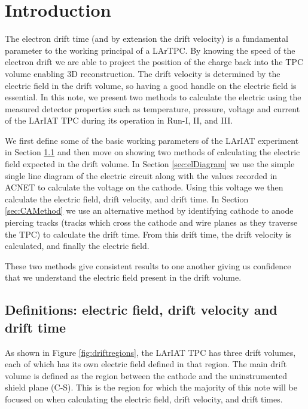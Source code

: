 \section{Introduction}\label{sec:Introduction} \label{sec:Intro}
The electron drift time (and by extension the drift velocity) is a fundamental parameter to the working principal of a LArTPC. By knowing the speed of the electron drift we are able to project the position of the charge back into the TPC volume enabling 3D reconstruction. The drift velocity is determined by the electric field in the drift volume, so having a good handle on the electric field is essential. In this note, we present two methods to calculate the electric using the measured detector properties such as temperature, pressure, voltage and current of the LArIAT TPC during its operation in Run-I, II, and III.

We first define some of the basic working parameters of the LArIAT experiment in Section \ref{sec:Def} and then move on showing two methods of calculating the electric field expected in the drift volume. In Section \ref{sec:elDiagram} we use the simple single line diagram of the electric circuit along with the values recorded in ACNET to calculate the voltage on the cathode. Using this voltage we then calculate the electric field, drift velocity, and drift time. In Section \ref{sec:CAMethod} we use an alternative method by identifying cathode to anode piercing tracks (tracks which cross the cathode and wire planes as they traverse the TPC) to calculate the drift time. From this drift time, the drift velocity is calculated, and finally the electric field. 

These two methods give consistent results to one another giving us confidence that we understand the electric field present in the drift volume.

\subsection{Definitions: electric field, drift velocity and drift time }\label{sec:Def}
As shown in Figure \ref{fig:driftregions}, the LArIAT TPC has three drift volumes, each of which has its own electric field defined in that region. The main drift volume is defined as the region between the cathode and the uninstrumented shield plane (C-S). This is the region for which the majority of this note will be focused on when calculating the electric field, drift velocity, and drift times.


